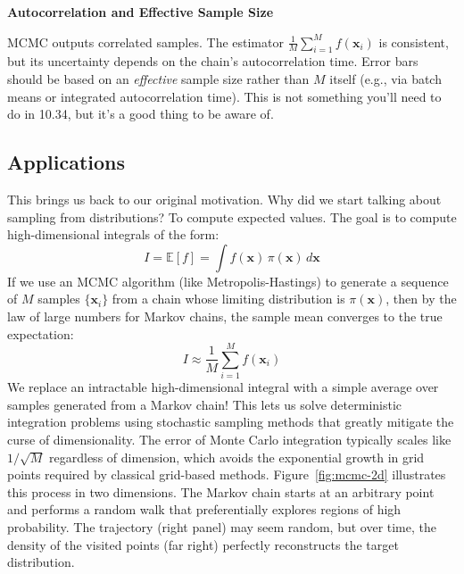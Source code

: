 \begin{warningBox}
    \textbf{Autocorrelation and Effective Sample Size}

    MCMC outputs correlated samples. The estimator $\frac{1}{M}\sum_{i=1}^M f(\mathbf{x}_i)$ is consistent, but its uncertainty depends on the chain's autocorrelation time. Error bars should be based on an \emph{effective} sample size rather than $M$ itself (e.g., via batch means or integrated autocorrelation time). This is not something you'll need to do in 10.34, but it's a good thing to be aware of.
\end{warningBox}

\subsection{Applications}
This brings us back to our original motivation. Why did we start talking about sampling from distributions? To compute expected values. The goal is to compute high-dimensional integrals of the form:
\begin{equation}
    I = \mathbb{E}[f] = \int f(\mathbf{x}) \, \pi(\mathbf{x}) \, d\mathbf{x}
\end{equation}
If we use an MCMC algorithm (like Metropolis-Hastings) to generate a sequence of $M$ samples $\{\mathbf{x}_i\}$ from a chain whose limiting distribution is $\pi(\mathbf{x})$, then by the law of large numbers for Markov chains, the sample mean converges to the true expectation:
\begin{equation}
    I \approx \frac{1}{M} \sum_{i=1}^{M} f(\mathbf{x}_i)
\end{equation}
We replace an intractable high-dimensional integral with a simple average over samples generated from a Markov chain! This lets us solve deterministic integration problems using stochastic sampling methods that greatly mitigate the curse of dimensionality. The error of Monte Carlo integration typically scales like $1/\sqrt{M}$ regardless of dimension, which avoids the exponential growth in grid points required by classical grid-based methods. Figure~\ref{fig:mcmc-2d} illustrates this process in two dimensions. The Markov chain starts at an arbitrary point and performs a random walk that preferentially explores regions of high probability. The trajectory (right panel) may seem random, but over time, the density of the visited points (far right) perfectly reconstructs the target distribution.


